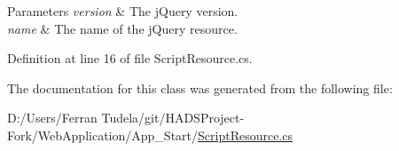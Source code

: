 \begin{DoxyParams}{Parameters}
{\em version} & The {\ttfamily j\+Query} version.\\
\hline
{\em name} & The name of the {\ttfamily j\+Query} resource.\\
\hline
\end{DoxyParams}


Definition at line 16 of file Script\+Resource.\+cs.



The documentation for this class was generated from the following file\+:\begin{DoxyCompactItemize}
\item 
D\+:/\+Users/\+Ferran Tudela/git/\+H\+A\+D\+S\+Project-\/\+Fork/\+Web\+Application/\+App\+\_\+\+Start/\mbox{\hyperlink{ScriptResource_8cs}{Script\+Resource.\+cs}}\end{DoxyCompactItemize}

